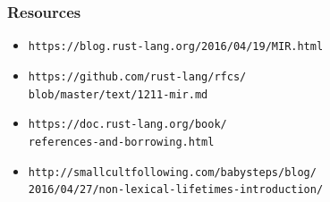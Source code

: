 \documentclass{beamer}
\begin{document}
\begin{frame}[fragile]
\frametitle{Resources}
\begin{itemize}
\item \verb|https://blog.rust-lang.org/2016/04/19/MIR.html|
\item \verb|https://github.com/rust-lang/rfcs/|\\\verb|blob/master/text/1211-mir.md|
\item \verb|https://doc.rust-lang.org/book/|\\\verb|references-and-borrowing.html|
\item \verb|http://smallcultfollowing.com/babysteps/blog/|\\\verb|2016/04/27/non-lexical-lifetimes-introduction/|
\end{itemize}
\end{frame}
\end{document}
